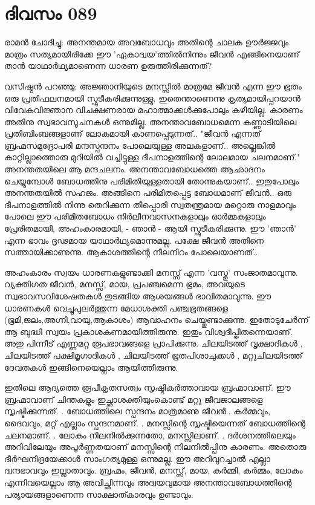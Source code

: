  
\section{ദിവസം 089}


രാമന്‍ ചോദിച്ചു: അനന്തമായ അവബോധവും അതിന്റെ ചാലക ഊര്‍ജ്ജവും മാത്രം സത്യമായിരിക്കേ ഈ 'ഏകാദ്വയ'ത്തില്‍നിന്നും ജീവന്‍ എങ്ങിനെയാണ്‌ താന്‍ യാഥാര്‍ഥ്യമാണെന്ന ധാരണ ഉരുത്തിരിക്കുന്നത്‌?

വസിഷ്ഠന്‍ പറഞ്ഞു: അജ്ഞാനിയുടെ മനസ്സില്‍ മാത്രമേ ജീവന്‍ എന്ന ഈ ഭൂതം ഒരു പ്രതിഫലനമായി സ്ഫുടീകരിക്കുന്നുള്ളു. ഇതെന്താണെന്നു കൃത്യമായിപ്പറയാന്‍ വിവേകവിജ്ഞാന വിചക്ഷണരായ മഹാത്മാക്കള്‍ക്കുപോലും കഴിയില്ല. കാരണം അതിനു സ്വഭാവസൂചനകള്‍ ഒന്നുമില്ല. അനന്താവബോധമെന്ന കണ്ണാടിയിലെ പ്രതിബിംബങ്ങളാണ്‌ ലോകമായി കാണപ്പെടുന്നത്‌..  "ജീവന്‍ എന്നത്‌ ബ്രഹ്മസമുദ്രോപരി മന്ദസ്പന്ദനം പോലെയുള്ള അലകളാണ്‌.. അല്ലെങ്കില്‍ കാറ്റില്ലാത്തൊരു മുറിയില്‍ വച്ചിട്ടുള്ള ദീപനാളത്തിന്റെ ലോലമായ ചലനമാണ്‌." അനന്തതയിലെ ആ മന്ദചലനം. അനന്താവബോധത്തെ ആഛാദനം ചെയ്യുമ്പോള്‍ ബോധത്തിനു പരിമിതിയുള്ളതായി തോന്നുകയാണ്‌.. ഇതുപോലും അനന്തതയില്‍ സഹജം. അങ്ങിനെ പരിമിതപ്പെട്ട ബോധമാണ്‌ ജീവന്‍.. ഒരു ദീപനാളത്തില്‍ നിന്നു തെറിക്കുന്ന തീപ്പൊരി സ്വതന്ത്രമായ മറ്റൊരു നാളമാവും പോലെ ഈ പരിമിതബോധം നിര്‍ലീനവാസനകളാലും ഓര്‍മ്മകളാലും പ്രേരിതമായി, അഹംകാരമായി, - ഞാന്‍ - ആയി സ്ഫുടീകരിക്കുന്നു. ഈ 'ഞാന്‍' എന്ന ഭാവം ദൃഢമായ യാഥാര്‍ഥ്യമൊന്നുമല്ല. പക്ഷേ ജീവന്‍ അതിനെ സത്തായിക്കാണുന്നു. ആകാശത്തിന്റെ നീലനിറം പോലെയാണത്‌..

അഹംകാരം സ്വയം ധാരണകളുണ്ടാക്കി മനസ്സ്‌ എന്ന 'വസ്തു' സംജാതമാവുന്നു. വ്യക്തിഗത ജീവന്‍, മനസ്സ്‌, മായ, പ്രപഞ്ചമെന്ന ഭ്രമം, അവയുടെ സ്വഭാവസവിശേഷതകള്‍ തുടങ്ങിയ ആശയങ്ങള്‍ ഭാവിതമാവുന്നു. ഈ ധാരണകള്‍ വെച്ചുപുലര്‍ത്തുന്ന മേധാശക്തി പഞ്ചഭൂതങ്ങളെ (ഭൂമി,ജലം,അഗ്നി,വായു,ആകാശം) ആവാഹനം ചെയ്തുണ്ടാക്കുന്നു. ഇതോടുചേര്‍ന്ന് ആ ബുദ്ധി സ്വയം പ്രകാശകണമായിത്തിരുന്നു. ഇതും വിശ്വദീപ്തിതന്നെയാണ്‌. അതു പിന്നീട്‌ എണ്ണമറ്റ രൂപഭാവങ്ങളെ പ്രാപിക്കുന്നു. ചിലയിടത്ത്‌ വൃക്ഷാദികള്‍ , ചിലയിടത്ത്‌ പക്ഷിമൃഗാദികള്‍ , ചിലയിടത്ത്‌ ഭൂതപിശാചുക്കള്‍ , മറ്റുചിലയിടത്ത്‌ ദേവതകള്‍ ഇങ്ങിനെയെല്ലാം ആയിത്തീരുന്നു.

ഇതിലെ ആദ്യത്തെ രൂപീകൃതസത്വം സൃഷ്ടികര്‍ത്താവായ ബ്രഹ്മാവാണ്‌. ഈ ബ്രഹ്മാവാണ്‌ ചിന്തകളും ഇച്ഛാശക്തിയുംകൊണ്ട്‌ മറ്റു ജീവജാലങ്ങളെ സൃഷ്ടിക്കുന്നത്‌. . ബോധത്തിലെ സ്പന്ദനം മാത്രമാണു ജീവന്‍.. കര്‍മ്മവും, ദൈവവും, മറ്റ്‌ എല്ലാം സ്പന്ദനമാണ്‌. . മനസ്സിന്റെ സൃഷ്ടിയെന്നത്‌ ബോധത്തിന്റെ ചലനമാണ്‌. . ലോകം നിലനില്‍ക്കുന്നതോ, മനസ്സിലാണ്‌. . ദര്‍ശനത്തിലെയും അറിവിലേയും അപൂര്‍ണ്ണതയാണ്‌ മനസ്സിന്റെ നിലനില്‍പ്പിനു കാരണം. അതൊരു ദീര്‍ഘനിദ്രയേക്കാള്‍ സാംഗത്യമുള്ള ഒന്നുമല്ല. ഈ അറിവുറച്ചാല്‍ എല്ലാ ദ്വന്ദഭാവവും ഇല്ലാതാവും. ബ്രഹ്മം, ജീവന്‍, മനസ്സ്‌, മായ, കര്‍മ്മി, കര്‍മ്മം, ലോകം എന്നിവയെല്ലാം ആ അവിച്ഛിന്നവും അദ്വയവുമായ അനന്താവബോധത്തിന്റെ പര്യായങ്ങളാണെന്ന സാക്ഷാത്കാരവും  ഉണ്ടാവും.

